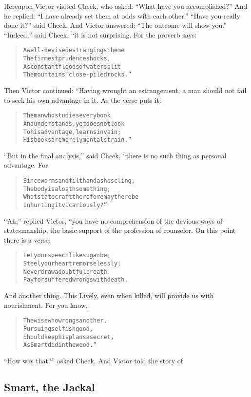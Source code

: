 \documentclass[article, twoside, 14pt]{memoir}
\renewenvironment{verbatim}{%
\begin{quote}%
\vskip -10pt%
\begin{alltt}\normalfont\large}{\end{alltt}%
\end{quote}%
\vskip -10pt
} %
\begin{document}
Hereupon Victor visited Cheek, who asked:
``What have you accomplished?'' And he replied:
``I have already set them at odds with each other.''
``Have you really done it?'' said Cheek. And Victor answered:
``The outcome will show you.'' ``Indeed,'' said Cheek, “it is not
surprising. For the proverb says:

\begin{verbatim}
A well-devised estranging scheme
    The firmest prudence shocks,
As constant floods of water split
    The mountains' close-piled rocks.”
\end{verbatim}
Then Victor continued: “Having wrought an estrangement, a man
should not fail to seek his own advantage in it. As the verse puts
it:

\begin{verbatim}
The man who studies every book
And understands, yet does not look
To his advantage, learns in vain;
His books are merely mental strain.”
\end{verbatim}
``But in the final analysis,'' said Cheek, “there is no such thing
as personal advantage. For

\begin{verbatim}
Since worms and filth and ashes cling,
The body is a loathsome thing;
What statecraft therefore may there be
In hurting it vicariously?”
\end{verbatim}
``Ah,'' replied Victor, “you have no comprehension of the devious
ways of statesmanship, the basic support of the profession of
counselor. On this point there is a verse:

\begin{verbatim}
Let your speech like sugar be,
Steel your heart remorselessly;
Never draw a doubtful breath:
Pay for suffered wrongs with death.
\end{verbatim}
And another thing. This Lively, even when killed, will provide us
with nourishment. For you know,

\begin{verbatim}
The wise who wrongs another,
    Pursuing selfish good,
Should keep his plans a secret,
    As Smart did in the wood.”
\end{verbatim}
``How was that?'' asked Cheek. And Victor told the story of

\subsection{Smart, the Jackal}

\label{s24}
\end{document}
